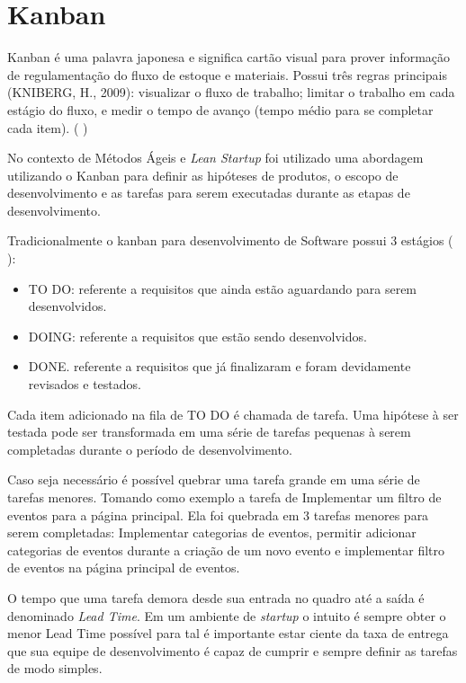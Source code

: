 \section{Kanban}
\par Kanban é uma palavra japonesa e significa cartão visual para prover informação de regulamentação do fluxo de estoque e materiais. Possui três regras principais (KNIBERG, H., 2009): visualizar o fluxo de trabalho; limitar o trabalho em cada estágio do fluxo, e medir o tempo de avanço (tempo médio para se completar cada item). ( \cite{francisco:14})
\par No contexto de Métodos Ágeis e \emph{Lean Startup} foi utilizado uma abordagem utilizando o Kanban para definir as hipóteses de produtos, o escopo de desenvolvimento e as tarefas para serem executadas durante as etapas de desenvolvimento.
\par Tradicionalmente o kanban para desenvolvimento de Software possui 3 estágios ( \cite{francisco:14}):
\begin{itemize}
        \item TO DO: referente a requisitos que ainda estão aguardando para serem
desenvolvidos.
        \item DOING: referente a requisitos que estão sendo desenvolvidos.
        \item DONE. referente a requisitos que já finalizaram e foram devidamente
revisados e testados.
\end{itemize}
\par Cada item adicionado na fila de TO DO é chamada de tarefa. Uma hipótese à ser testada pode ser transformada em uma série de tarefas pequenas à serem completadas durante o período de desenvolvimento.
\par Caso seja necessário é possível quebrar uma tarefa grande em uma série de tarefas menores. Tomando como exemplo a tarefa de Implementar um filtro de eventos para a página principal. Ela foi quebrada em 3 tarefas menores para serem completadas: Implementar categorias de eventos, permitir adicionar categorias de eventos durante a criação de um novo evento e implementar filtro de eventos na página principal de eventos.
\par O tempo que uma tarefa demora desde sua entrada no quadro até a saída é denominado \emph{Lead Time}. Em um ambiente de \emph{startup} o intuito é sempre obter o menor Lead Time possível para tal é importante estar ciente da taxa de entrega que sua equipe de desenvolvimento é capaz de cumprir e sempre definir as tarefas de modo simples.
